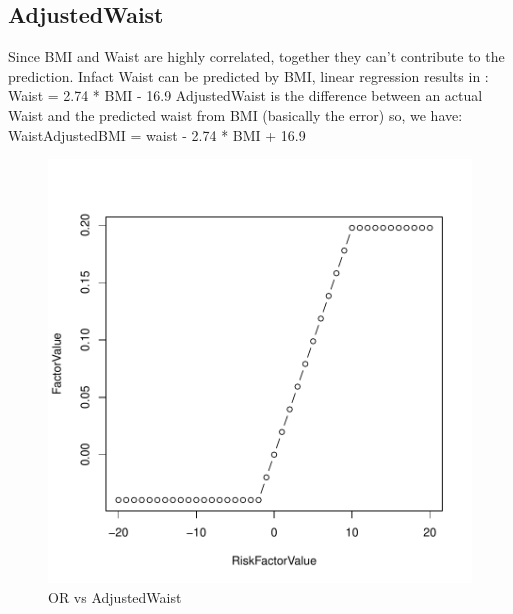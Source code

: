\documentclass{report}
\begin{document}
\subsection{\color{green}AdjustedWaist}
Since BMI and Waist are highly correlated, together they can't contribute to the prediction. Infact Waist can be predicted by BMI,
linear regression results in : 
Waist = 2.74 * BMI - 16.9
AdjustedWaist is the difference between an actual Waist and the predicted waist from BMI (basically the error)
so, we have:
WaistAdjustedBMI = waist - 2.74 * BMI + 16.9
\begin{center}
\begin{figure}[H]
\includegraphics{EPFL-adwaist}
\caption{OR vs AdjustedWaist}
\end{figure}
\end{center}

\newpage
\end{document}
